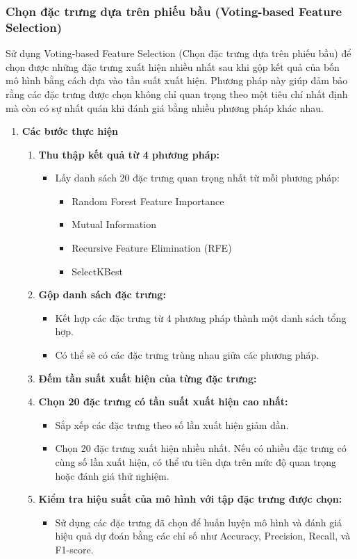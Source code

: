 \documentclass[13pt]{article}
\begin{document}
\subsubsection{Chọn đặc trưng dựa trên phiếu bầu (Voting-based Feature Selection)}
Sử dụng Voting-based Feature Selection (Chọn đặc trưng dựa trên phiếu bầu) để chọn được những đặc trưng xuất hiện nhiều nhất sau khi gộp kết quả của bốn mô hình bằng cách dựa vào tần suất xuất hiện. Phương pháp này giúp đảm bảo rằng các đặc trưng được chọn không chỉ quan trọng theo một tiêu chí nhất định mà còn có sự nhất quán khi đánh giá bằng nhiều phương pháp khác nhau.
\begin{enumerate}
    \item \textbf{Các bước thực hiện}
    \begin{enumerate}
        \item \textbf{Thu thập kết quả từ 4 phương pháp: }
        \begin{itemize}
            \item Lấy danh sách 20 đặc trưng quan trọng nhất từ mỗi phương pháp:
            \begin{itemize}
                \item Random Forest Feature Importance
                \item Mutual Information
                \item Recursive Feature Elimination (RFE)
                \item SelectKBest
            \end{itemize}
        \end{itemize}
        \item \textbf{Gộp danh sách đặc trưng: }
        \begin{itemize}
            \item Kết hợp các đặc trưng từ 4 phương pháp thành một danh sách tổng hợp.
            \item Có thể sẽ có các đặc trưng trùng nhau giữa các phương pháp.
        \end{itemize}
        \item \textbf{Đếm tần suất xuất hiện của từng đặc trưng:}
        \item \textbf{Chọn 20 đặc trưng có tần suất xuất hiện cao nhất:}
        \begin{itemize}
            \item Sắp xếp các đặc trưng theo số lần xuất hiện giảm dần.
            \item Chọn 20 đặc trưng xuất hiện nhiều nhất. Nếu có nhiều đặc trưng có cùng số lần xuất hiện, có thể ưu tiên dựa trên mức độ quan trọng hoặc đánh giá thử nghiệm.
        \end{itemize}
        \item \textbf{Kiểm tra hiệu suất của mô hình với tập đặc trưng được chọn:}
        \begin{itemize}
            \item Sử dụng các đặc trưng đã chọn để huấn luyện mô hình và đánh giá hiệu quả dự đoán bằng các chỉ số như Accuracy, Precision, Recall, và F1-score.
        \end{itemize}
    \end{enumerate}
    

\end{enumerate}
\end{document}
